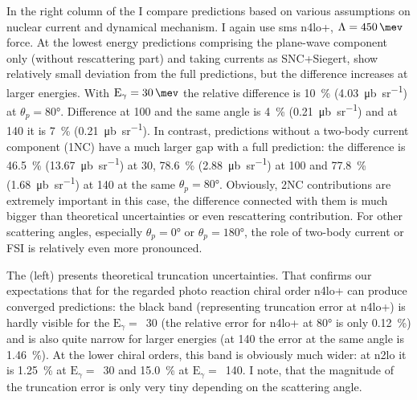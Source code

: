     
    In the right column of the  I compare predictions
    based on various assumptions on nuclear current and dynamical mechanism.
    I again use \gls{sms} \gls{n4lo+}, $\Lambda=\SI{450}{\mev}$ force.
    At the lowest energy predictions comprising the plane-wave component only (without rescattering part)
    and taking currents as SNC+Siegert, show relatively small deviation from the full predictions, but the difference increases at larger energies.
    With $\text{E}_\gamma=\SI{30}{\mev}$ the relative difference is \SI{10}{\percent} (\SI{4.03}{\micro \barn \per \steradian})
    at $\theta_p = \ang{80}$. Difference at \SI{100}{\mev} and the same angle is \SI{4}{\percent} (\SI{0.21}{\micro \barn \per \steradian})
    and at \SI{140}{\mev} it is \SI{7}{\percent} (\SI{0.21}{\micro \barn \per \steradian}).
    In contrast, predictions without a two-body current component (1NC) have a much larger gap with a full prediction:
    the difference is \SI{46.5}{\percent} (\SI{13.67}{\micro \barn \per \steradian}) at \SI{30}{\mev},
    \SI{78.6}{\percent} (\SI{2.88}{\micro \barn \per \steradian}) at \SI{100}{\mev} and
    \SI{77.8}{\percent} (\SI{1.68}{\micro \barn \per \steradian}) at \SI{140}{\mev}
    at the same $\theta_p=\ang{80}$.
    Obviously, 2NC contributions are extremely important in this case, the difference connected with them
    is much bigger than theoretical uncertainties or even rescattering contribution.
    For other scattering angles, especially $\theta_p=\ang{0}$ or $\theta_p=\ang{180}$,
    the role of two-body current or FSI is relatively even more pronounced.


    The  (left)
    presents theoretical truncation uncertainties.
    That confirms our expectations
    that for the regarded photo reaction chiral order
    \gls{n4lo+} can produce converged predictions: 
    the black band (representing truncation error at \gls{n4lo+}) is hardly visible
    for the $\text{E}_\gamma=$~\SI{30}{\mev}
    (the relative error for \gls{n4lo+} at \ang{80} is only \SI{0.12}{\percent})
    and is also quite narrow for larger energies (at \SI{140}{\mev} 
    the error at the same angle is \SI{1.46}{\percent}).
    At the lower chiral orders, this band is obviously much wider:
    at \gls{n2lo} it is \SI{1.25}{\percent} at $\text{E}_\gamma=$~\SI{30}{\mev}
    and \SI{15.0}{\percent} at $\text{E}_\gamma=$~\SI{140}{\mev}.
    I note, that the magnitude of the truncation error is only very tiny depending on the scattering angle.
    
